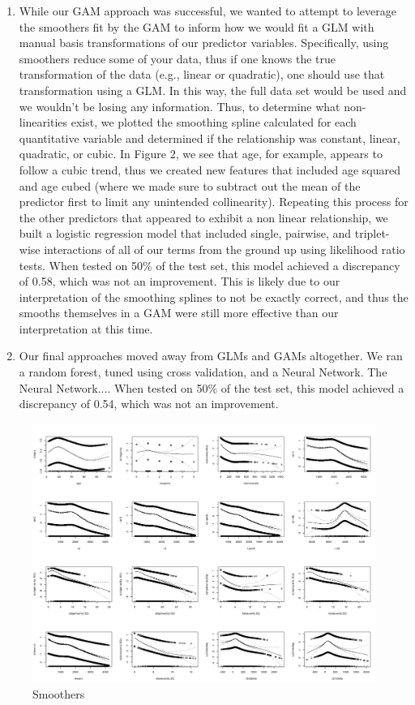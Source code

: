 \documentclass[11pt, oneside]{article}   	%
\begin{document}
\begin{enumerate}
  \item
  While our GAM approach was successful, we wanted to attempt to leverage the smoothers fit by the GAM to inform how we would fit a GLM with manual basis transformations of our predictor variables. Specifically, using smoothers reduce some of your data, thus if one knows the true transformation of the data (e.g., linear or quadratic), one should use that transformation using a GLM. In this way, the full data set would be used and we wouldn't be losing any information. Thus, to determine what non-linearities exist, we plotted the smoothing spline calculated for each quantitative variable and determined if the relationship was constant, linear, quadratic, or cubic. In Figure 2, we see that age, for example, appears to follow a cubic trend, thus we created new features that included age squared and age cubed (where we made sure to subtract out the mean of the predictor first to limit any unintended collinearity). Repeating this process for the other predictors that appeared to exhibit a non linear relationship, we built a logistic regression model that included single, pairwise, and triplet-wise interactions of all of our terms from the ground up using likelihood ratio tests. When tested on 50\% of the test set, this model achieved a discrepancy of 0.58, which was not an improvement. This is likely due to our interpretation of the smoothing splines to not be exactly correct, and thus the smooths themselves in a GAM were still more effective than our interpretation at this time.
  
    \item
  Our final approaches moved away from GLMs and GAMs altogether. We ran a random forest, tuned using cross validation, and a Neural Network. The Neural Network.... When tested on 50\% of the test set, this model achieved a discrepancy of 0.54, which was not an improvement. 
  
  
\end{enumerate}
  \FloatBarrier
  \begin{figure}[!ht]
    \centering
    \includegraphics[width=\textwidth]{smoothers.png}
    \caption{Smoothers}
  \end{figure}
  \FloatBarrier
\end{document}
